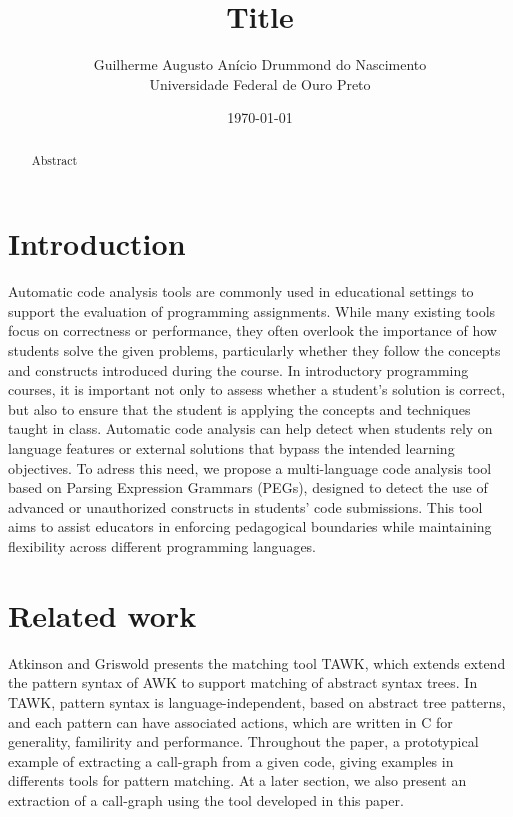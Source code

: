 \documentclass[10pt,sigplan,screen,review,anonymous]{acmart}
\title{Title}
\author{Guilherme Augusto Anício Drummond do Nascimento \\ Universidade Federal de Ouro Preto}
\date{\today}
\begin{document}
\begin{abstract}
    Abstract
\end{abstract}

\maketitle

% 
\section{Introduction}
Automatic code analysis tools are commonly used in educational settings to
support the evaluation of programming assignments. While many existing tools
focus on correctness or performance, they often overlook the importance of
how students solve the given problems, particularly whether they follow the
concepts and constructs introduced during the course. 
In introductory programming courses, it is important not only to assess 
whether a student's solution is correct, but also to ensure that the 
student is applying the concepts and techniques taught in class. 
Automatic code analysis can help detect when students rely on language 
features or external solutions that bypass the intended learning objectives.
To adress this need, we propose a multi-language code analysis tool based on 
Parsing Expression Grammars (PEGs), designed to detect the use of advanced 
or unauthorized constructs in students' code submissions. This tool aims to 
assist educators in enforcing pedagogical boundaries while maintaining 
flexibility across different programming languages.


\section{Related work}

Atkinson and Griswold\cite{atkinson2006-effective-pattern-matching} presents 
the matching tool TAWK, which extends extend the pattern syntax of AWK to 
support matching of abstract syntax trees. In TAWK, pattern syntax is 
language-independent, based on abstract tree patterns, and each pattern can 
have associated actions, which are written in C for generality, familirity 
and performance. Throughout the paper, a prototypical example of extracting 
a call-graph from a given code, giving examples in differents tools for 
pattern matching.
At a later section, we also present an extraction of a call-graph using the
tool developed in this paper.
\end{document}

